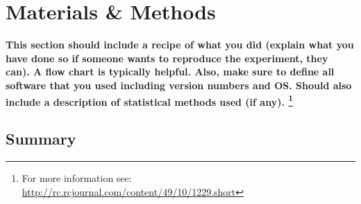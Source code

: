 \chapter{Materials \& Methods}

\textbf{This section should include a recipe of what you did (explain what you have done so if someone wants to reproduce the experiment, they can).  A flow chart is typically helpful.  Also, make sure to define all software that you used including version numbers and OS.  Should also include a description of statistical methods used (if any).  \footnote{For more information see: \url{http://rc.rcjournal.com/content/49/10/1229.short}}}

\Blindtext

\section{Summary}